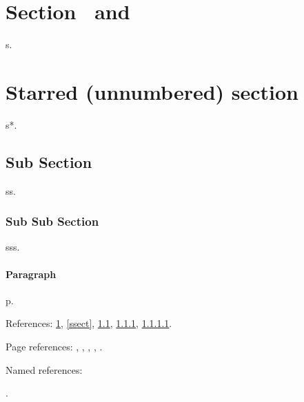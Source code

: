 \documentclass[final]{ltugboat}
\begin{document}
\tableofcontents
\section{Section \TUB\ and }\label{sect} s.
\section*{Starred (unnumbered) section \TUB}\label{ssect} s*.
\subsection{Sub Section \TUB}\label{subsec} ss.
\subsubsection{Sub Sub Section \TUB}\label{subsubsec} sss.
\paragraph{Paragraph \TUB}\label{para} p.

References: \ref{sect}, \ref{ssect}, \ref{subsec}, \ref{subsubsec}, \ref{para}.

Page references: \pageref{sect}, \pageref{ssect}, \pageref{subsec},
\pageref{subsubsec}, \pageref{para}.

Named references:\par
{}\par {}\par {}\par
{}\par {}.
\end{document}

